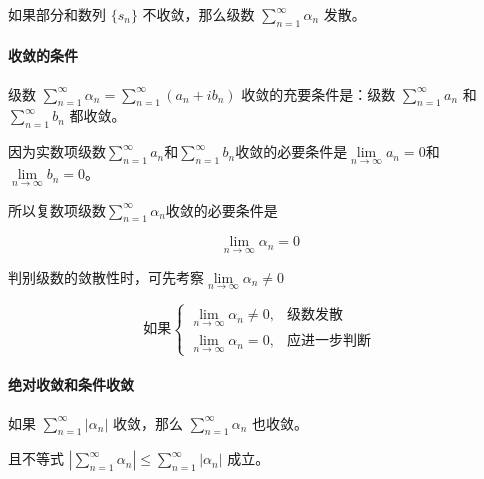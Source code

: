 如果部分和数列 \(\{s_{n}\}\) 不收敛，那么级数
\(\sum\limits_{n=1}^{\infty}\alpha_{n}\) 发散。
\paragraph{收敛的条件}
\label{收敛的条件}
级数 \(\sum\limits_{n=1}^{\infty} \alpha_n = \sum\limits_{n=1}^{\infty} (a_n + i b_n)\)
收敛的充要条件是：级数 \(\sum\limits_{n=1}^{\infty} a_n\) 和 \(\sum\limits_{n=1}^{\infty} b_n\) 都收敛。

\begin{tcolorbox}[title={必要条件},colback=red!5!white
,colframe=red!75!black
,colbacktitle=yellow!50!red
,coltitle=red!25!black, fonttitle=\bfseries,subtitle style={boxrule=0.4pt, colback=yellow!50!red!25!white}]
因为实数项级数\(\sum\limits_{n=1}^{\infty} a_{n}\)和\(\sum\limits_{n=1}^{\infty} b_{n}\)收敛的必要条件是\(\lim\limits_{n\to\infty} a_{n}=0\)和\(\lim\limits_{n\to\infty}b_{n}=0\)。

所以复数项级数\(\sum\limits_{n=1}^{\infty} \alpha_{n}\)收敛的必要条件是

\[
\boxed{\lim\limits_{n\to\infty} \alpha_{n}=0}
\]

\end{tcolorbox}

\begin{tcolorbox}[title={Tips},colback=red!5!white
,colframe=red!75!black
,colbacktitle=yellow!50!red
,coltitle=red!25!black, fonttitle=\bfseries,subtitle style={boxrule=0.4pt, colback=yellow!50!red!25!white}]
判别级数的敛散性时，可先考察\(\lim\limits_{n \to \infty} \alpha_n \not= 0\)

\[
\text{如果}\begin{cases}
\lim\limits_{n \to \infty} \alpha_n \neq 0, & \text{级数发散} \\
\lim\limits_{n \to \infty} \alpha_n = 0, & \text{应进一步判断}
\end{cases}
\]

\end{tcolorbox}
\paragraph{绝对收敛和条件收敛}
\label{绝对收敛和条件收敛}
如果 \(\sum\limits_{n=1}^{\infty} \left| \alpha_n \right|\) 收敛，那么
\(\sum\limits_{n=1}^{\infty} \alpha_n\) 也收敛。

且不等式
\(\left| \sum\limits_{n=1}^{\infty} \alpha_n \right| \le \sum\limits_{n=1}^{\infty} \left| \alpha_n \right|\)
成立。

